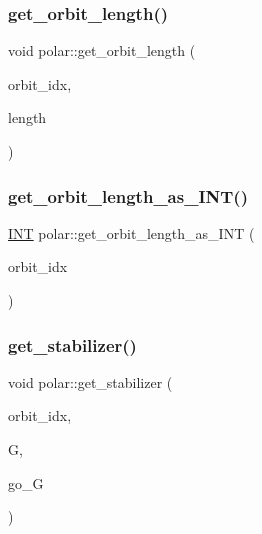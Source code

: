 \subsubsection{\texorpdfstring{get\+\_\+orbit\+\_\+length()}{get\_orbit\_length()}}
{\footnotesize\ttfamily void polar\+::get\+\_\+orbit\+\_\+length (\begin{DoxyParamCaption}\item[{\mbox{\hyperlink{galois_8h_a09fddde158a3a20bd2dcadb609de11dc}{I\+NT}}}]{orbit\+\_\+idx,  }\item[{\mbox{\hyperlink{classlonginteger__object}{longinteger\+\_\+object}} \&}]{length }\end{DoxyParamCaption})}

\mbox{\label{classpolar_ae8574de93d217b3fb710406683d1f102}} 
\subsubsection{\texorpdfstring{get\+\_\+orbit\+\_\+length\+\_\+as\+\_\+\+I\+N\+T()}{get\_orbit\_length\_as\_INT()}}
{\footnotesize\ttfamily \mbox{\hyperlink{galois_8h_a09fddde158a3a20bd2dcadb609de11dc}{I\+NT}} polar\+::get\+\_\+orbit\+\_\+length\+\_\+as\+\_\+\+I\+NT (\begin{DoxyParamCaption}\item[{\mbox{\hyperlink{galois_8h_a09fddde158a3a20bd2dcadb609de11dc}{I\+NT}}}]{orbit\+\_\+idx }\end{DoxyParamCaption})}

\mbox{\label{classpolar_a02d21f42aa46c13add56aa88fb33ed81}} 
\subsubsection{\texorpdfstring{get\+\_\+stabilizer()}{get\_stabilizer()}}
{\footnotesize\ttfamily void polar\+::get\+\_\+stabilizer (\begin{DoxyParamCaption}\item[{\mbox{\hyperlink{galois_8h_a09fddde158a3a20bd2dcadb609de11dc}{I\+NT}}}]{orbit\+\_\+idx,  }\item[{\mbox{\hyperlink{classgroup}{group}} \&}]{G,  }\item[{\mbox{\hyperlink{classlonginteger__object}{longinteger\+\_\+object}} \&}]{go\+\_\+G }\end{DoxyParamCaption})}

